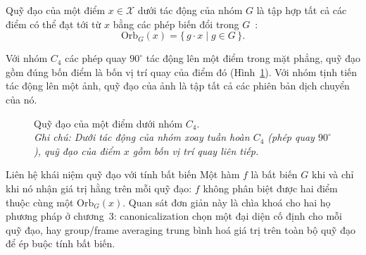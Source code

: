 \begin{definition}
\label{def:quy-dao}
Quỹ đạo của một điểm $x\in\mathcal{X}$ dưới tác động của nhóm $G$ là tập hợp tất cả các điểm có thể đạt tới từ $x$ bằng các phép biến đổi trong $G$~\cite{jegelka2025tutorial}:
\begin{equation}
\label{eq:orbit}
\mathrm{Orb}_{G}(x) = \{\, g\cdot x \mid g\in G \,\}.
\end{equation}
\end{definition}
 
\begin{example}
\label{vd:orbit}
Với nhóm $C_{4}$ các phép quay $90^{\circ}$ tác động lên một điểm trong mặt phẳng, quỹ đạo gồm đúng bốn điểm là bốn vị trí quay của điểm đó (Hình~\ref{fig:orbit}). Với nhóm tịnh tiến tác động lên một ảnh, quỹ đạo của ảnh
là tập tất cả các phiên bản dịch chuyển của nó.
\end{example}
 
\begin{figure}[H]
\centering
{}
\caption[Quỹ đạo của một điểm dưới nhóm $C_4$]{Quỹ đạo của một điểm dưới nhóm $C_4$.\protect\\[2pt]
\textit{Ghi chú: Dưới tác động của nhóm xoay tuần hoàn $C_4$ (phép quay $90^{\circ}$), quỹ đạo của điểm $x$ gồm bốn vị trí quay liên tiếp.}}
\label{fig:orbit}
\end{figure}
 
\begin{infobox}{Liên hệ khái niệm quỹ đạo với tính bất biến}
Một hàm $f$ là bất biến $G$ khi và chỉ khi nó nhận giá trị hằng trên
mỗi quỹ đạo: $f$ không phân biệt được hai điểm thuộc cùng một
$\mathrm{Orb}_{G}(x)$. Quan sát đơn giản này là chìa khoá cho hai họ phương pháp
ở chương~3: canonicalization chọn một đại diện cố định cho mỗi quỹ đạo, hay group/frame averaging trung bình hoá giá trị trên toàn bộ quỹ đạo để ép buộc tính bất biến.
\end{infobox}

